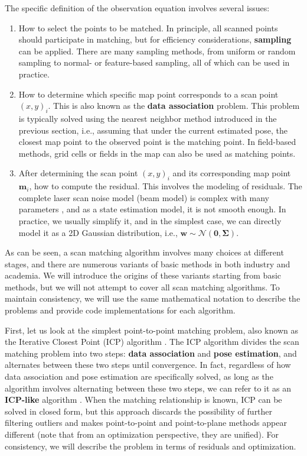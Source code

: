 The specific definition of the observation equation involves several issues:
\begin{enumerate}
	\item How to select the points to be matched. In principle, all scanned points should participate in matching, but for efficiency considerations, \textbf{sampling} can be applied. There are many sampling methods, from uniform or random sampling to normal- or feature-based sampling, all of which can be used in practice.
	\item How to determine which specific map point corresponds to a scan point $(x,y)_i$. This is also known as the \textbf{data association} problem. This problem is typically solved using the nearest neighbor method introduced in the previous section, i.e., assuming that under the current estimated pose, the closest map point to the observed point is the matching point. In field-based methods, grid cells or fields in the map can also be used as matching points.
	\item After determining the scan point $(x,y)_i$ and its corresponding map point $\mathbf{m}_i$, how to compute the residual. This involves the modeling of residuals. The complete laser scan noise model (beam model) is complex with many parameters \cite{Cabaleiro2015}, and as a state estimation model, it is not smooth enough. In practice, we usually simplify it, and in the simplest case, we can directly model it as a 2D Gaussian distribution, i.e., $\mathbf{w} \sim \mathcal{N}(\mathbf{0}, \boldsymbol{\Sigma})$.
\end{enumerate}

As can be seen, a scan matching algorithm involves many choices at different stages, and there are numerous variants of basic methods in both industry and academia. We will introduce the origins of these variants starting from basic methods, but we will not attempt to cover all scan matching algorithms. To maintain consistency, we will use the same mathematical notation to describe the problems and provide code implementations for each algorithm.

First, let us look at the simplest point-to-point matching problem, also known as the Iterative Closest Point (ICP) algorithm \cite{Besl1992}. The ICP algorithm divides the scan matching problem into two steps: \textbf{data association} and \textbf{pose estimation}, and alternates between these two steps until convergence. In fact, regardless of how data association and pose estimation are specifically solved, as long as the algorithm involves alternating between these two steps, we can refer to it as an \textbf{ICP-like} algorithm \cite{Koide2020,segal2009generalized,Zhang2021a}. When the matching relationship is known, ICP can be solved in closed form, but this approach discards the possibility of further filtering outliers and makes point-to-point and point-to-plane methods appear different (note that from an optimization perspective, they are unified). For consistency, we will describe the problem in terms of residuals and optimization.

